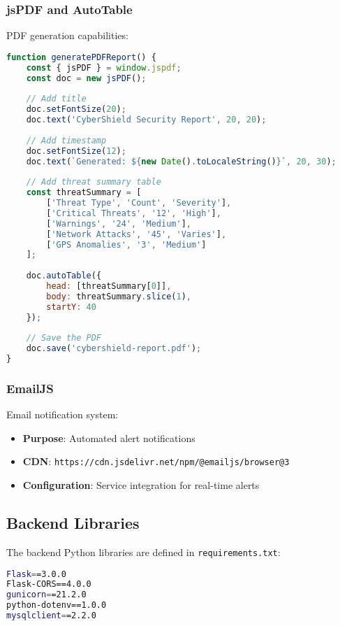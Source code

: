 \documentclass[12pt,a4paper]{report}
\begin{document}
\subsubsection{jsPDF and AutoTable}
PDF generation capabilities:
\begin{lstlisting}[language=JavaScript, caption=PDF Export Implementation]
function generatePDFReport() {
    const { jsPDF } = window.jspdf;
    const doc = new jsPDF();
    
    // Add title
    doc.setFontSize(20);
    doc.text('CyberShield Security Report', 20, 20);
    
    // Add timestamp
    doc.setFontSize(12);
    doc.text(`Generated: ${new Date().toLocaleString()}`, 20, 30);
    
    // Add threat summary table
    const threatSummary = [
        ['Threat Type', 'Count', 'Severity'],
        ['Critical Threats', '12', 'High'],
        ['Warnings', '24', 'Medium'],
        ['Network Attacks', '45', 'Varies'],
        ['GPS Anomalies', '3', 'Medium']
    ];
    
    doc.autoTable({
        head: [threatSummary[0]],
        body: threatSummary.slice(1),
        startY: 40
    });
    
    // Save the PDF
    doc.save('cybershield-report.pdf');
}
\end{lstlisting}

\subsubsection{EmailJS}
Email notification system:
\begin{itemize}
    \item \textbf{Purpose}: Automated alert notifications
    \item \textbf{CDN}: \texttt{https://cdn.jsdelivr.net/npm/@emailjs/browser@3}
    \item \textbf{Configuration}: Service integration for real-time alerts
\end{itemize}

\subsection{Backend Libraries}

The backend Python libraries are defined in \texttt{requirements.txt}:

\begin{lstlisting}[language=bash, caption=Python Requirements]
Flask==3.0.0
Flask-CORS==4.0.0
gunicorn==21.2.0
python-dotenv==1.0.0
mysqlclient==2.2.0
\end{lstlisting}
\end{document}
